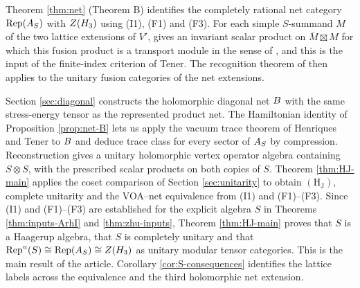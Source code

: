 \documentclass[leqno]{article}
\let\cal\relax
\newcommand{\cal}{\mathcal}
\newcommand{\ot}{\otimes}
\newcommand{\ovl}{\overline}
\DeclareMathOperator{\Rep}{Rep}
\numberwithin{equation}{section}
\begin{document}
Theorem \ref{thm:net} (Theorem B) identifies the completely rational net category $\Rep(\cal A_S)$ with $Z(\cal H_3)$ using (I1), (F1) and (F3). For each simple $S$-summand $M$ of the two lattice extensions of $V'$, \cite[Proposition 5.2]{ArhII} gives an invariant scalar product on $\ovl M \boxtimes M$ for which this fusion product is a transport module in the sense of \cite[Definition 3.3 p.~26]{Ten24}, and this is the input of the finite-index criterion of Tener. The recognition theorem of \cite[Theorem 6.1]{ArhII} then applies to the unitary fusion categories of the net extensions.

Section \ref{sec:diagonal} constructs the holomorphic diagonal net $\cal B$ with the same stress-energy tensor as the represented product net. The Hamiltonian identity of Proposition \ref{prop:net-B} lets us apply the vacuum trace theorem of Henriques and Tener \cite{HeT26} to $\cal B$ and deduce trace class for every sector of $\cal A_S$ by compression. Reconstruction \cite{HeT25} gives a unitary holomorphic vertex operator algebra containing $S \ot S$, with the prescribed scalar products on both copies of $S$. Theorem \ref{thm:HJ-main} applies the coset comparison of Section \ref{sec:unitarity} to obtain $\mathrm{(H_J)}$, complete unitarity and the VOA--net equivalence from (I1) and (F1)--(F3). Since (I1) and (F1)--(F3) are established for the explicit algebra $S$ in Theorems \ref{thm:inputs-ArhI} and \ref{thm:zhu-inputs}, Theorem \ref{thm:HJ-main} proves that $S$ is a Haagerup algebra, that $S$ is completely unitary and that $\Rep^u(S) \cong \Rep(\cal A_S) \cong Z(\cal H_3)$ as unitary modular tensor categories. This is the main result of the article. Corollary \ref{cor:S-consequences} identifies the lattice labels across the equivalence and the third holomorphic net extension.
\end{document}
